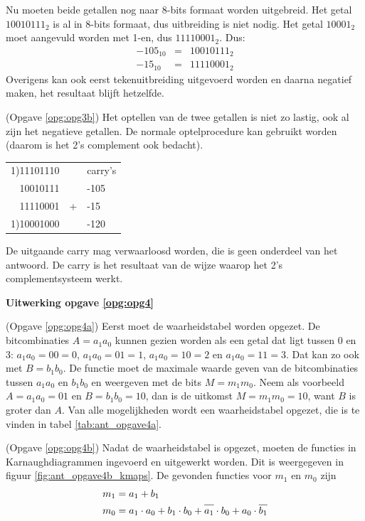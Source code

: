 \documentclass[a4paper,12pt,addpoints,fleqn,dutch]{tisdexam}
\newcommand*{\oline}[1]{\overline{#1\mathstrut}}
\begin{document}
\begin{questions}
Nu moeten beide getallen nog naar 8-bits formaat worden uitgebreid. Het getal
$10010111_{2}$ is al in 8-bits formaat, dus uitbreiding is niet nodig. Het
getal $10001_{2}$ moet aangevuld worden met 1-en, dus $11110001_{2}$. Dus:
\begin{eqnarray}
\nonumber -105_{10} & = & 10010111_{2} \\
\nonumber -15_{10}  & = & 11110001_{2}
\end{eqnarray}
Overigens kan ook eerst tekenuitbreiding uitgevoerd worden en daarna
negatief maken, het resultaat blijft hetzelfde.

(Opgave \ref{opg:opg3b}) Het optellen van de twee getallen is niet zo lastig,
ook al zijn het negatieve getallen. De normale optelprocedure kan gebruikt
worden (daarom is het 2's complement ook bedacht).

\begin{table}[H]
  \begin{tabular}{ r c l }
   1)11101110 &   & carry's     \\
     10010111 &   & -105        \\
     11110001 & + & -15         \\  \cline{1-1}
   1)10001000 &   & -120    
  \end{tabular}
\end{table}

De uitgaande carry mag verwaarloosd worden, die is geen onderdeel van het antwoord.
De carry is het resultaat van de wijze waarop het 2's complementsysteem werkt.


\vspace{1em}

\textbf{Uitwerking opgave \ref{opg:opg4}}

(Opgave \ref{opg:opg4a}) Eerst moet de waarheidstabel worden opgezet. De
bitcombinaties $A = a_{1}a_{0}$ kunnen gezien worden als een
getal dat ligt tussen 0 en 3: $a_{1}a_{0} = 00 = 0$, $a_{1}a_{0} = 01 = 1$,
$a_{1}a_{0} = 10 = 2$ en $a_{1}a_{0} = 11 = 3$. Dat kan zo ook met
$B = b_{1}b_{0}$. De functie moet de maximale waarde geven van de bitcombinaties
tussen $a_{1}a_{0}$ en $b_{1}b_{0}$ en weergeven met de bits $M = m_{1}m_{0}$.
Neem als voorbeeld $A = a_{1}a_{0} = 01$ en $B = b_{1}b_{0} = 10$, dan is de uitkomst
$M = m_{1}m_{0} = 10$, want $B$ is groter dan $A$. Van alle mogelijkheden
wordt een waarheidstabel opgezet, die is te vinden in tabel \ref{tab:ant_opgave4a}.

(Opgave \ref{opg:opg4b}) Nadat de waarheidstabel is opgezet, moeten de functies
in Karnaughdiagrammen ingevoerd en uitgewerkt worden. Dit is weergegeven in
figuur \ref{fig:ant_opgave4b_kmaps}. De gevonden functies voor $m_{1}$ en $m_{0}$
zijn
\begin{equation*}
\begin{split}
m_{1} & = a_{1} + b_{1} \\
m_{0} & = a_{1} \cdot a_{0} + b_{1} \cdot b_{0} + \oline{a_{1}} \cdot b_{0} + a_{0} \cdot \oline{b_{1}}
\end{split}
\end{equation*}


\end{questions}
\end{document}
